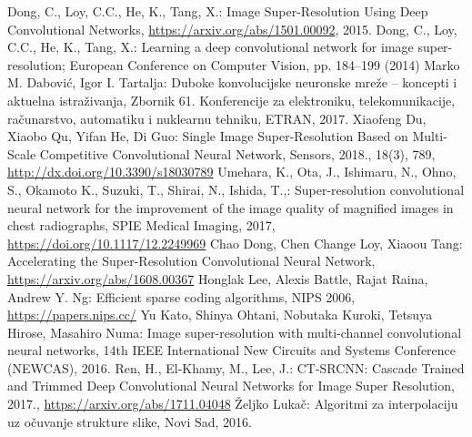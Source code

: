 \documentclass[12pt]{report}
\newtheorem{example}{Primjer}[chapter]
\numberwithin{equation}{section}
\begin{document}






\begin{thebibliography}{10}

 Dong, C., Loy, C.C., He, K., Tang, X.: Image Super-Resolution Using Deep Convolutional Networks, \url{https://arxiv.org/abs/1501.00092}, 2015.
 Dong, C., Loy, C.C., He, K., Tang, X.: Learning a deep convolutional network for image super-resolution; European Conference on Computer Vision, pp. 184–199 (2014)
 Marko M. Dabović, Igor I. Tartalja: Duboke konvolucijske neuronske mreže – koncepti i aktuelna istraživanja, Zbornik 61. Konferencije za elektroniku, telekomunikacije, računarstvo, automatiku i nuklearnu tehniku, ETRAN, 2017.
 Xiaofeng Du, Xiaobo Qu, Yifan He, Di Guo: Single Image Super-Resolution Based on Multi-Scale Competitive Convolutional Neural Network, Sensors, 2018., 18(3), 789, \url{http://dx.doi.org/10.3390/s18030789}
 Umehara, K., Ota, J., Ishimaru, N., Ohno, S., Okamoto K., Suzuki, T., Shirai, N., Ishida, T.,: Super-resolution convolutional neural network for the improvement of the image quality of magnified images in chest radiographs, SPIE Medical Imaging, 2017, \url{https://doi.org/10.1117/12.2249969}
 Chao Dong, Chen Change Loy, Xiaoou Tang: Accelerating the Super-Resolution Convolutional Neural Network, \url{https://arxiv.org/abs/1608.00367}
 Honglak Lee, Alexis Battle, Rajat Raina, Andrew Y. Ng: Efficient sparse coding algorithms, NIPS 2006, \url{https://papers.nips.cc/}
 Yu Kato, Shinya Ohtani, Nobutaka Kuroki, Tetsuya Hirose, Masahiro Numa: Image super-resolution with multi-channel convolutional neural networks, 14th IEEE International New Circuits and Systems Conference (NEWCAS), 2016.
  Ren, H., El-Khamy, M., Lee, J.: CT-SRCNN: Cascade Trained and Trimmed Deep Convolutional Neural Networks for Image Super Resolution, 2017., \url{https://arxiv.org/abs/1711.04048}
 Željko Lukač: Algoritmi za interpolaciju uz očuvanje strukture slike, Novi Sad, 2016. 


\end{thebibliography}
\end{document}
